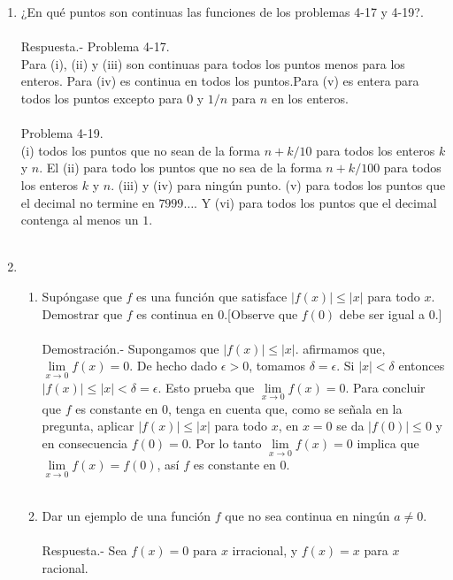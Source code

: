 \begin{enumerate}[\bfseries 1.]
\item ¿En qué puntos son continuas las funciones de los problemas 4-17 y 4-19?.\\\\
    Respuesta.-\; Problema 4-17.\\
    Para (i), (ii) y (iii) son continuas para todos los puntos menos para los enteros. Para (iv) es continua en todos los puntos.Para (v) es entera para todos los puntos excepto para $0$ y $1/n$ para $n$ en los enteros.\\\\
    Problema 4-19.\\
    (i) todos los puntos que no sean de la forma $n+k/10$ para todos los enteros $k$ y $n$. El (ii) para todo los puntos que no sea de la forma $n+k/100$ para todos los enteros $k$ y $n$. (iii) y (iv) para ningún punto. (v) para todos los puntos que el decimal no termine en $7999 \ldots$. Y (vi) para todos los puntos que el decimal contenga al menos un $1$.\\\\

\item 
    \begin{enumerate}[\bfseries (a)]

	\item Supóngase que $f$ es una función que satisface $|f(x)|\leq |x|$ para todo $x$. Demostrar que $f$ es continua en $0$.[Observe que $f(0)$ debe ser igual a $0$.]\\\\
	    Demostración.-\; Supongamos que $|f(x)|\leq |x|$. afirmamos que, $\lim\limits_{x\to 0} f(x)=0$. De hecho dado $\epsilon>0$, tomamos $\delta=\epsilon$. Si $|x|<\delta$ entonces $|f(x)|\leq |x|<\delta = \epsilon$. Esto prueba que $\lim\limits_{x\to 0} f(x) = 0$. Para concluir que $f$ es constante en $0$, tenga en cuenta que, como se señala en la pregunta, aplicar $|f(x)|\leq |x|$ para todo $x$, en $x=0$ se da $|f(0)|\leq 0$ y en consecuencia $f(0)=0$.  Por lo tanto $\lim\limits_{x \to 0} f(x) = 0$ implica que $\lim\limits_{x\to 0} f(x) = f(0)$, así $f$ es constante en $0$.\\\\

	\item Dar un ejemplo de una función $f$ que no sea continua en ningún $a\neq 0$.\\\\
	    Respuesta.-\; Sea $f(x)=0$ para $x$ irracional, y $f(x)=x$ para $x$ racional.\\\\


\end{enumerate}
\end{enumerate}
